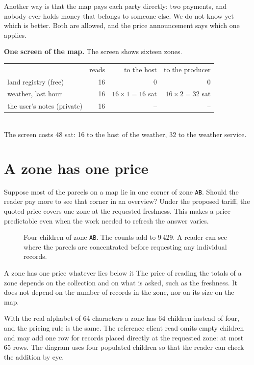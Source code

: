 \documentclass[11pt]{article}
\newcommand{\fig}[4][]{\begin{figure}[H]\centering\vspace{0.3em}\ixnew{figures/#2.tikz}\caption{#3}\label{fig:#4}\end{figure}}
\begin{document}
Another way is that the map pays each party directly: two payments, and nobody ever holds money that belongs to someone else. We do not know yet which is better. Both are allowed, and the price announcement says which one applies.

\begin{example}
\textbf{One screen of the map.} The screen shows sixteen zones.\\[3pt]
\begin{tabular}{@{}lrrr@{}}
 & reads & to the host & to the producer\\
land registry (free) & 16 & 0 & 0\\
weather, last hour & 16 & $16\times 1 = 16$ sat & $16\times 2 = 32$ sat\\
the user's notes (private) & 16 & -- & --
\end{tabular}\\[3pt]
The screen costs 48 sat: 16 to the host of the weather, 32 to the weather service.
\end{example}

\section{A zone has one price}

Suppose most of the parcels on a map lie in one corner of zone \texttt{AB}. Should the reader pay more to see that corner in an overview? Under the proposed tariff, the quoted price covers one zone at the requested freshness. This makes a price predictable even when the work needed to refresh the answer varies.

\fig{zoneprice}{Four children of zone \texttt{AB}. The counts add to 9\,429. A reader can see where the parcels are concentrated before requesting any individual records.}{zoneprice}

\begin{guarantee}{A zone has one price whatever lies below it}
The price of reading the totals of a zone depends on the collection and on what is asked, such as the freshness. It does not depend on the number of records in the zone, nor on its size on the map.
\end{guarantee}

With the real alphabet of 64 characters a zone has 64 children instead of four, and the pricing rule is the same. The reference client read omits empty children and may add one row for records placed directly at the requested zone: at most 65 rows. The diagram uses four populated children so that the reader can check the addition by eye.
\end{document}

